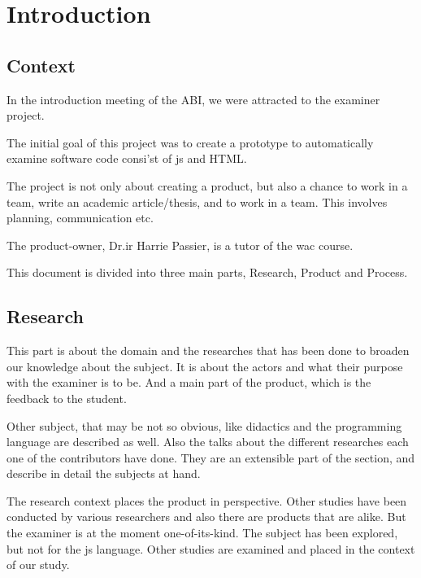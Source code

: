 \chapter{Introduction}



\section{Context} 

In the introduction meeting of the ABI, we were attracted to the \gls{examiner} project.

The initial goal of this project was to create a prototype to automatically examine
software code consi'st of \gls{js} and HTML.

The project is not only about creating a product, but also a chance to work in a team, write an academic article/thesis, and to work in a team. This involves planning, communication etc.

The product-owner, Dr.ir Harrie Passier, is a tutor of the \gls{wac} course.


This document is divided into three main parts, Research, Product and Process.

\section{Research}
This part is about the domain and the researches that has been done to broaden our knowledge about the subject.
It is about the actors and what their purpose with the \gls{examiner} is to be.
And a main part of the product, which is the feedback to the student.

Other subject, that may be not so obvious, like didactics and the programming language are described as well.
Also the talks about the different researches each one of the contributors have done.
They are an extensible part of the section, and describe in detail the subjects at hand.

The research context places the product in perspective. Other studies have been conducted by various researchers and also there are products that are alike.
But the \gls{examiner} is at the moment one-of-its-kind.
The subject has been explored, but not for the \gls{js} language.
Other studies are examined and placed in the context of our study.

